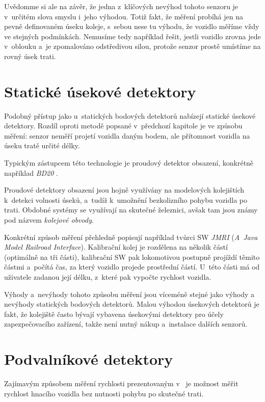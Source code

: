 Uvědomme si ale na závěr, že jedna z~klíčových nevýhod tohoto senzoru je
v~určitém slova smyslu i~jeho výhodou. Totiž fakt, že měření probíhá jen na
pevně definovaném úseku koleje, s~sebou nese tu výhodu, že vozidlo měříme vždy
ve stejných podmínkách. Nemusíme tedy například řešit, jestli vozidlo zrovna
jede v~oblouku a~je zpomalováno odstředivou silou, protože senzor prostě
umístíme na rovný úsek trati.

\section{Statické úsekové detektory}
\label{sec:det-usek}

Podobný přístup jako u~statických bodových detektorů nabízejí statické
úsekové detektory. Rozdíl oproti metodě popsané v~předchozí kapitole je
ve způsobu měření: senzor neměří projetí vozidla daným bodem, ale přítomnost
vozidla na úseku tratě určité délky.

Typickým zástupcem této technologie je proudový detektor obsazení, konkrétně
například \textit{BD20} \cite{bd20}.

Proudové detektory obsazení jsou hojně využívány na modelových kolejištích
k~detekci volnosti úseků, a~tudíž k~umožnění bezkolizního pohybu vozidla po
trati.  Obdobné systémy se využívají na skutečné železnici, avšak tam jsou
známy pod názvem \textit{kolejové obvody}.

Konkrétní způsob měření přehledně popisují například tvůrci SW \textit{JMRI}
\cite{jmri:speedometer} (\textit{A~Java Model Railroad Interface}).
Kalibrační kolej je rozdělena na několik částí (optimálně na tři části),
kalibrační SW pak lokomotivou postupně projíždí těmito částmi a~počítá čas, za
který vozidlo projede prostřední částí. U~této části má od uživatele zadanou
její délku, z~které pak vypočte rychlost vozidla.

Výhody a~nevýhody tohoto způsobu měření jsou víceméně stejné jako výhody a
nevýhody statických bodových detektorů. Malou výhodou úsekových detektorů je
fakt, že kolejiště často bývají vybavena úsekovými detektory pro účely
zapezpečovacího zařízení, takže není nutný nákup a~instalace dalších senzorů.

\section{Podvalníkové detektory}
\label{sec:det-podval}

Zajímavým způsobem měření rychlosti prezentovaným v~\cite{bachrus}
je možnost měřit rychlost hnacího vozidla bez nutnosti pohybu po skutečné trati.

